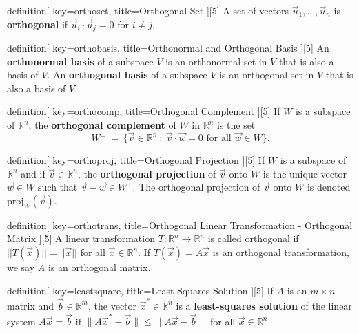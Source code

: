 \begin{SaveConcept}{definition}[
		key=orthoset,
		title={Orthogonal Set}
	][5]
        A set of vectors $\vec u_1, \dots, \vec u_n$ is {\bf orthogonal} if $\vec u_i\cdot \vec u_j = 0 $ for  $ i \neq j$. 
\end{SaveConcept}

\begin{SaveConcept}{definition}[
		key=orthobasis,
		title={Orthonormal and Orthogonal Basis}
	][5]
        An {\bf orthonormal basis} of a subspace $V$ is an orthonormal set in $V$ that is also a basis of $V$. An {\bf orthogonal basis} of a subspace $V$ is an orthogonal set in $V$ that is also a basis of $V$.
\end{SaveConcept}


\begin{SaveConcept}{definition}[
		key=orthocomp,
		title={Orthogonal Complement}
	][5]
	If $W$ is a subspace of $\mathbb R^n$, the {\bf orthogonal complement} of $W$ in $\mathbb R^n$ is the set
	$$
	W^\bot \ = \ \{\vec{v}\in \mathbb R^n \::\: \vec{v}\cdot \vec{w}=0\text{ for all $\vec{w}\in W$}\}.
	$$
\end{SaveConcept}


\begin{SaveConcept}{definition}[
		key=orthoproj,
		title={Orthogonal Projection}
	][5]
        If $W$ is a subspace of $\mathbb R^n$ and if $\vec{v}\in \mathbb R^n$, the {\bf orthogonal projection} of $\vec{v}$ onto $W$ is the unique vector $\vec{w}\in W$ such that $\vec{v}-\vec{w}\in W^\bot$. The orthogonal projection of $\vec{v}$ onto $W$ is  denoted $\text{proj}_W(\vec{v})$.
\end{SaveConcept}

\begin{SaveConcept}{definition}[
		key=orthotrans,
		title={Orthogonal Linear Transformation - Orthogonal Matrix}
	][5]
            A linear transformation $T: \mathbb{R}^n\rightarrow\mathbb{R}^n$ is called orthogonal if $||T(\vec x)||=||\vec x||$ for all $\vec x\in\mathbb{R}^n.$ If $T(\vec x)=A\vec x$ is an orthogonal transformation, we say $A$ is an orthogonal matrix.
\end{SaveConcept}


\begin{SaveConcept}{definition}[
		key=leastsquare,
		title={Least-Squares Solution}
	][5]
        If $A$ is an $m\times n$ matrix and $\vec{b}\in\mathbb R^m$, the vector $\vec{x}^*\in\mathbb R^n$ is a {\bf least-squares solution} of the linear system $A\vec{x}=\vec{b}$ if $\|A\vec{x}^*-\vec{b}\|\leq\|A\vec{x}-\vec{b}\|$ for all $\vec{x}\in\mathbb R^n$.
\end{SaveConcept}

